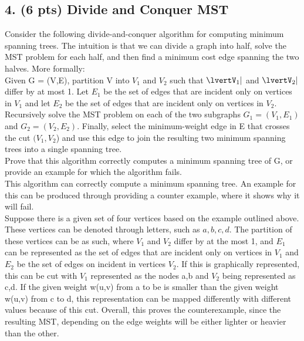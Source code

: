 \documentclass[12pt]{article}
\begin{document}
\subsection*{4. (6 pts) Divide and Conquer MST}
Consider the following divide-and-conquer algorithm for computing minimum spanning trees. The intuition is that we can divide a graph into half, solve the MST problem for each half, and then find a minimum cost edge spanning the two halves. More formally: \\
\linebreak
Given G = (V,E), partition V into $V_1$ and $V_2$ such that $\lvertV_1\rvert$ and $\lvertV_2\rvert$ differ by at most 1. Let $E_1$ be the set of edges that are incident only on vertices in $V_1$ and let $E_2$ be the set of edges that are incident only on vertices in $V_2$. Recursively solve the MST problem on each of the two subgraphs $G_1 = (V_1, E_1)$ and $G_2 = (V_2, E_2)$. Finally, select the minimum-weight edge in E that crosses the cut $(V_1,V_2$) and use this edge to join the resulting two minimum spanning trees into a single spanning tree. \\
\linebreak
Prove that this algorithm correctly computes a minimum spanning tree of G, or provide an example for which the algorithm fails. \\ 
\linebreak
This algorithm can correctly compute a minimum spanning tree. An example for this can be produced through providing a counter example, where it shows why it will fail.  \\
\linebreak
Suppose there is a given set of four vertices based on the example outlined above. These vertices can be denoted through letters, such as $a,b,c,d$. The partition of these vertices can be as such, where $V_1$ and $V_2$ differ by at the most 1, and $E_1$ can be represented as the set of edges that are incident only on vertices in $V_1$ and $E_2$ be the set of edges on incident in vertices $V_2$. If this is graphically represented, this can be cut with $V_1$ represented as the nodes {a,b} and $V_2$ being represented as {c,d}. If the given weight w(u,v) from a to be is smaller than the given weight w(u,v) from c to d, this representation can be mapped differently with different values because of this cut. Overall, this proves the counterexample, since the resulting MST, depending on the edge weights will be either lighter or heavier than the other. \\
\end{document}
